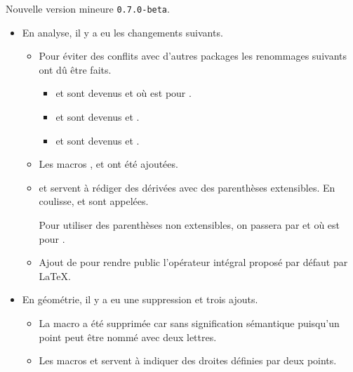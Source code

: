 Nouvelle version mineure \verb+0.7.0-beta+.

\begin{itemize}[itemsep=.5em]
    \item En analyse, il y a eu les changements suivants.
    \begin{itemize}[itemsep=.5em]
        \item Pour éviter des conflits avec d'autres packages les renommages suivants ont dû être faits.
        \begin{itemize}[itemsep=.5em]
            \item {} et  sont devenus  et  où  est pour .

            \item {} et  sont devenus  et .

            \item {} et  sont devenus  et .
        \end{itemize}

		\item Les macros ,  et  ont été ajoutées.

 		\item {} et  servent à rédiger des dérivées avec des parenthèses extensibles. En coulisse,  et  sont appelées.

        Pour utiliser des parenthèses non extensibles, on passera par  et  où  est pour .

		\item Ajout de  pour rendre public l'opérateur intégral proposé par défaut par \LaTeX.
    \end{itemize}




    \item En géométrie, il y a eu une suppression et trois ajouts.
    \begin{itemize}[itemsep=.5em]
        \item La macro  a été supprimée car sans signification sémantique puisqu'un point peut être nommé avec deux lettres.

        \item Les macros  et  servent à indiquer des droites définies par deux points.


\end{itemize}
\end{itemize}
